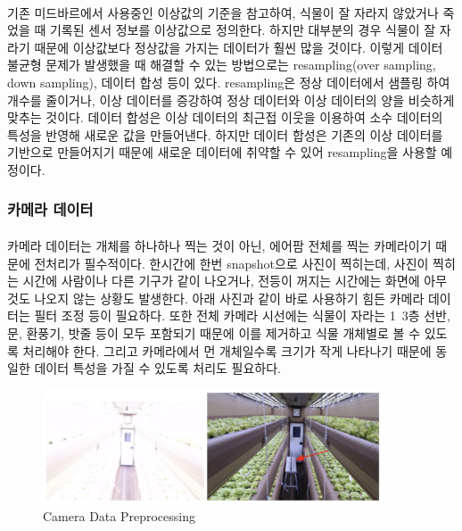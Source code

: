 \documentclass[11pt]{article}
\begin{document}
    \paragraph{} 기존 미드바르에서 사용중인 이상값의 기준을 참고하여, 식물이 잘 자라지 않았거나 죽었을 때 기록된 센서 정보를 이상값으로 정의한다. 하지만 대부분의 경우 식물이 잘 자라기 때문에 이상값보다 정상값을 가지는 데이터가 훨씬 많을 것이다. 이렇게 데이터 불균형 문제가 발생했을 때 해결할 수 있는 방법으로는 resampling(over sampling, down sampling), 데이터 합성 등이 있다. resampling은 정상 데이터에서 샘플링 하여 개수를 줄이거나, 이상 데이터를 증강하여 정상 데이터와 이상 데이터의 양을 비슷하게 맞추는 것이다. 데이터 합성은 이상 데이터의 최근접 이웃을 이용하여 소수 데이터의 특성을 반영해 새로운 값을 만들어낸다. 하지만 데이터 합성은 기존의 이상 데이터를 기반으로 만들어지기 때문에 새로운 데이터에 취약할 수 있어 resampling을 사용할 예정이다\citep{bouarourou2023predictive}.

    \subsubsection{카메라 데이터}

    \paragraph{} 카메라 데이터는 개체를 하나하나 찍는 것이 아닌, 에어팜 전체를 찍는 카메라이기 때문에 전처리가 필수적이다. 한시간에 한번 snapshot으로 사진이 찍히는데, 사진이 찍히는 시간에 사람이나 다른 기구가 같이 나오거나, 전등이 꺼지는 시간에는 화면에 아무것도 나오지 않는 상황도 발생한다. 아래 사진과 같이 바로 사용하기 힘든 카메라 데이터는 필터 조정 등이 필요하다. 또한 전체 카메라 시선에는 식물이 자라는 1~3층 선반, 문, 환풍기, 밧줄 등이 모두 포함되기 때문에 이를 제거하고 식물 개체별로 볼 수 있도록 처리해야 한다. 그리고 카메라에서 먼 개체일수록 크기가 작게 나타나기 때문에 동일한 데이터 특성을 가질 수 있도록 처리도 필요하다. 

    \begin{figure}[h]
    \centering
    \includegraphics[width=0.9\textwidth]{Latex_Proposal/images/cam_pre.png} %
    \caption{Camera Data Preprocessing}
    \label{fig:came_pre}
    \end{figure}
\end{document}
